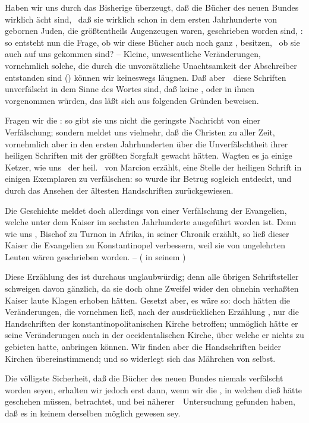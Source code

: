 Haben wir uns durch das Bisherige überzeugt, daß die Bücher des neuen Bundes wirklich ächt sind, \dh\ daß sie wirklich schon in dem ersten Jahrhunderte von gebornen Juden, die größtentheils Augenzeugen waren, geschrieben worden sind, \usw : so entsteht nun die Frage, ob wir diese Bücher auch noch ganz , besitzen, \dh\ ob sie auch  auf uns gekommen sind? -- Kleine, unwesentliche Veränderungen, vornehmlich solche, die durch die unvorsätzliche Unachtsamkeit der Abschreiber entstanden sind () können wir keineswegs läugnen. Daß aber~\ diese Schriften unverfälscht in dem Sinne des Wortes sind, daß keine , oder  in ihnen vorgenommen würden, das läßt sich aus folgenden Gründen beweisen.
\begin{aufza}
\item Fragen wir die : so gibt sie uns nicht die geringste Nachricht von einer Verfälschung; sondern meldet uns vielmehr, daß die Christen zu aller Zeit, vornehmlich aber in den ersten Jahrhunderten über die Unverfälschtheit ihrer heiligen Schriften mit der größten Sorgfalt gewacht hätten. Wagten es ja einige Ketzer, wie uns \zB\ der heil.\  von Marcion erzählt, eine Stelle der heiligen Schrift in einigen Exemplaren zu verfälschen: so wurde ihr Betrug sogleich entdeckt, und durch das Ansehen der ältesten Handschriften zurückgewiesen.
\item[\RWbet{Einwurf.}] Die Geschichte meldet doch allerdings von einer Verfälschung der Evangelien, welche unter dem Kaiser  im sechsten Jahrhunderte ausgeführt worden ist. Denn wie uns , Bischof zu Turnon in Afrika, in seiner Chronik erzählt, so ließ dieser Kaiser die Evangelien zu Konstantinopel verbessern, weil sie von ungelehrten Leuten wären geschrieben worden. -- ( in seinem )
\item[\RWbet{Antwort.}] Diese Erzählung des  ist durchaus unglaubwürdig; denn alle übrigen Schriftsteller schweigen davon gänzlich, da sie doch ohne Zweifel wider den ohnehin verhaßten Kaiser laute Klagen erhoben hätten. Gesetzt aber, es wäre so: doch hätten die Veränderungen, die  vornehmen ließ, nach der ausdrücklichen Erzählung , nur die Handschriften der konstantinopolitanischen Kirche betroffen; unmöglich hätte er seine Veränderungen auch in der occidentalischen Kirche, über welche er nichts zu gebieten hatte, anbringen können. Wir finden aber die Handschriften beider Kirchen übereinstimmend; und so widerlegt sich das Mährchen von selbst.
\item Die völligste Sicherheit, daß die Bücher des neuen Bundes niemals verfälscht worden seyen, erhalten wir jedoch erst dann, wenn wir die , in welchen dieß hätte geschehen müssen, betrachtet, und bei näherer~\ Untersuchung gefunden haben, daß es in keinem derselben möglich gewesen sey.
\end{aufza}
